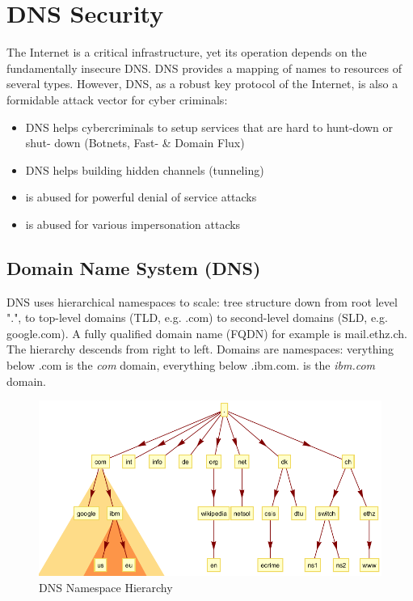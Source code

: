 \documentclass[11pt,oneside,a4paper]{article}
\begin{document}
\section{DNS Security}

The Internet is a critical infrastructure, yet its operation depends on the fundamentally insecure DNS. DNS provides a mapping of names to resources of several types. However, DNS, as a robust key protocol of the Internet, is also a formidable attack vector for cyber criminals:

\vspace{-\topsep}
\begin{itemize}
	\setlength{\itemsep}{0pt}
	\setlength{\parskip}{0pt}
	\item DNS helps cybercriminals to setup services that are hard to hunt-down or shut-
	down (Botnets, Fast- \& Domain Flux)
	\item DNS helps building hidden channels (tunneling)
	\item is abused for powerful denial of service attacks
	\item is abused for various impersonation attacks
\end{itemize}
\vspace{-\topsep}

\subsection{Domain Name System (DNS)}

DNS uses hierarchical namespaces to scale: tree structure down from root level ".", to top-level domains (TLD, e.g. .com) to second-level domains (SLD, e.g. google.com). A fully qualified domain name (FQDN) for example is mail.ethz.ch. The hierarchy descends from right to left. Domains are namespaces: verything below .com is the \textit{com} domain, everything below .ibm.com. is the \textit{ibm.com} domain.

\begin{figure}[hb]
	\centering
	\includegraphics[width=0.6\linewidth]{figures/dns_namespace_hierarchy}
	\caption{DNS Namespace Hierarchy}
	\label{fig:dnsnamespacehierarchy}
\end{figure}
\end{document}

